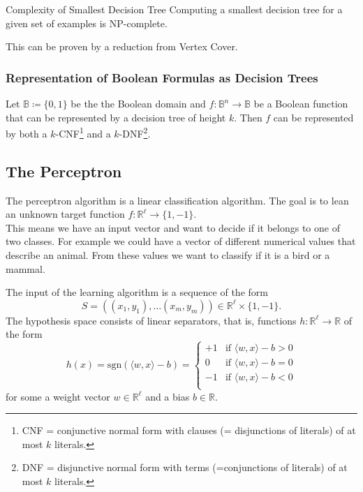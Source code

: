 \documentclass{panikzettel}
\begin{document}
\begin{theo}{Complexity of Smallest Decision Tree}
Computing a smallest decision tree for a given set of examples is NP-complete.
\end{theo}

This can be proven by a reduction from Vertex Cover.

\subsubsection{Representation of Boolean Formulas as Decision Trees}
Let $\mathbb{B} \coloneqq \{0,1\}$ be the the Boolean domain and $f:\mathbb{B}^n\rightarrow \mathbb{B}$ be a Boolean function that can be represented by a decision tree of height $k$. Then $f$ can be represented by both a $k$-CNF\footnote{CNF = conjunctive normal form with clauses (= disjunctions of literals) of at most $k$ literals.} and a $k$-DNF\footnote{DNF = disjunctive normal form with terms (=conjunctions of literals) of at most $k$ literals.}.




\subsection{The Perceptron}
The perceptron algorithm is a linear classification algorithm. The goal is to lean an unknown target function \mbox{$f:\mathbb{R}^\ell \rightarrow \{1,-1\}$.}\\
This means we have an input vector and want to decide if it belongs to one of two classes. For example we could have a vector of different numerical values that describe an animal. From these values we want to classify if it is a bird or a mammal.

The input of the learning algorithm is a sequence of the form
\[
S=((x_1,y_1),\ldots (x_m,y_m))\in\mathbb{R}^\ell\times\{1,-1\}.
\]
The hypothesis space consists of linear separators, that is, functions $h:\mathbb{R}^\ell \rightarrow \mathbb{R}$ of the form
\[
h(x)=\text{sgn}(\langle w,x\rangle -b)=
\begin{cases}
+1 & \text{if } \langle w,x\rangle-b > 0  \\
0 & \text{if } \langle w,x\rangle-b = 0  \\
-1 & \text{if } \langle w,x\rangle-b < 0  \\
\end{cases}
\]
for some a weight vector $w\in\mathbb{R}^\ell$ and a bias $b\in\mathbb{R}$.
\end{document}

